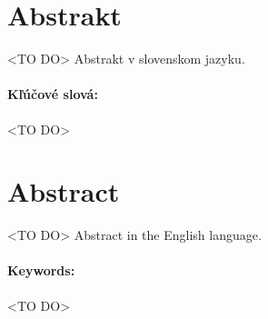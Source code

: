 \documentclass[12pt, twoside]{book}
\begin{document}
\newpage 
\section*{Abstrakt}

<TO DO> Abstrakt v slovenskom jazyku.

\paragraph*{Kľúčové slová:} <TO DO>


\newpage 
\section*{Abstract}

<TO DO> Abstract in the English language.


\paragraph*{Keywords:} <TO DO>


%
%
%


\newpage 

\tableofcontents


\newpage 

\listoffigures
\listoftables


\mainmatter
\pagestyle{headings}


 












\newpage	

\backmatter

\thispagestyle{empty}
\clearpage


 




\end{document}

